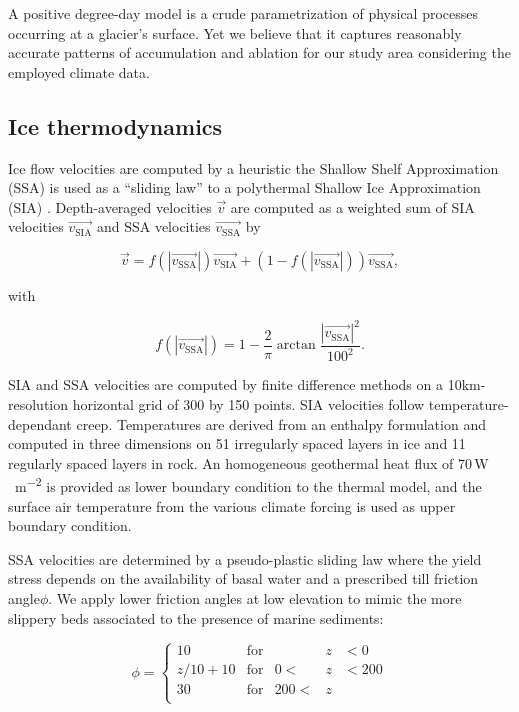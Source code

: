 A positive degree-day model is a crude parametrization of physical processes occurring at a glacier's surface. Yet we believe that it captures reasonably accurate patterns of accumulation and ablation for our study area considering the employed climate data.

\subsection{Ice thermodynamics}

Ice flow velocities are computed by a heuristic the Shallow Shelf Approximation (SSA) is used as a ``sliding law'' to a polythermal Shallow Ice Approximation (SIA) \citep{bueler-brown-2009}. Depth-averaged velocities $\vec{v}$ are computed as a weighted sum of SIA velocities $\vec{v_{\mathrm{SIA}}}$ and SSA velocities $\vec{v_{\mathrm{SSA}}}$ by

\begin{equation}
	\vec{v} = f(|\vec{v_{\mathrm{SSA}}}|)\vec{v_{\mathrm{SIA}}}
  + (1-f(|\vec{v_{\mathrm{SSA}}}|))\vec{v_{\mathrm{SSA}}},
\end{equation}

with

\begin{equation}
	f(|\vec{v_{\mathrm{SSA}}}|) = 1
	- \frac{2}{\pi}\arctan{\frac{|\vec{v_{\mathrm{SSA}}}|^2}{100^2}}.
\end{equation}

SIA and SSA velocities are computed by finite difference methods on a 10km-resolution horizontal grid of 300 by 150 points. SIA velocities follow temperature-dependant creep. Temperatures are derived from an enthalpy formulation \citep{aschwanden-etal-2012} and computed in three dimensions on 51 irregularly spaced layers in ice and 11 regularly spaced layers in rock. An homogeneous geothermal heat flux of 70\,\unit{W\,m^{-2}} is provided as lower boundary condition to the thermal model, and the surface air temperature from the various climate forcing is used as upper boundary condition.

SSA velocities are determined by a pseudo-plastic sliding law where the yield stress depends on the availability of basal water and a prescribed till friction angle$\phi$. We apply lower friction angles at low elevation to mimic the more slippery beds associated to the presence of marine sediments:

\begin{equation}
	\phi = \left\{\begin{array}{llrll}
		10      & \mathrm{for} &      &z&<  0 \\
		z/10+10 & \mathrm{for} &   0 <&z&<200 \\
		30      & \mathrm{for} & 200 <&z&     \\
	\end{array}\right.
\end{equation}


